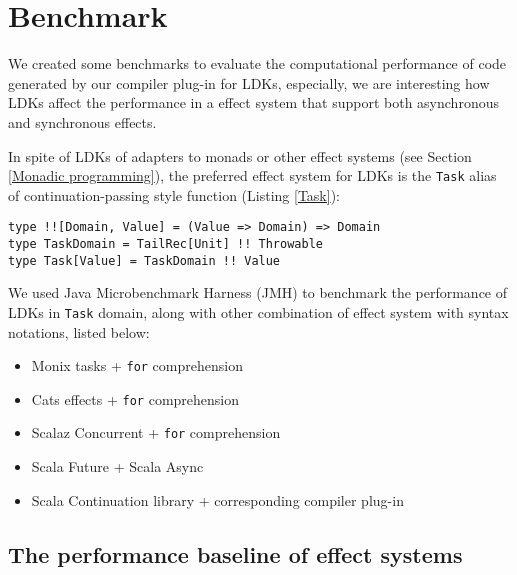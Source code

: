 \section{Benchmark}\label{Benchmark}

We created some benchmarks to evaluate the computational performance of code generated by our compiler plug-in for LDKs, especially, we are interesting how LDKs affect the performance in a effect system that support both asynchronous and synchronous effects.

In spite of LDKs of adapters to monads or other effect systems (see Section \ref{Monadic programming}), the preferred effect system for LDKs is the \lstinline{Task} alias of continuation-passing style function (Listing \ref{Task}):

\begin{lstlisting}[caption={The definition of \lstinline{Task}, the preferred effect system using with LDKs},label={Task}]
type !![Domain, Value] = (Value => Domain) => Domain
type TaskDomain = TailRec[Unit] !! Throwable
type Task[Value] = TaskDomain !! Value
\end{lstlisting}

We used Java Microbenchmark Harness (JMH) to benchmark the performance of LDKs in \lstinline{Task} domain, along with other combination of effect system with syntax notations, listed below:

\begin{itemize}
  \item Monix tasks \cite{nedelcu2017monix} + \lstinline{for} comprehension
  \item Cats effects \cite{typelevel2017cats} + \lstinline{for} comprehension
  \item Scalaz Concurrent \cite{kenji2017scalaz} + \lstinline{for} comprehension
  \item Scala Future \cite{haller2012sip} + Scala Async \cite{haller2013sip}
  \item Scala Continuation library + corresponding compiler plug-in \cite{rompf2009implementing}
\end{itemize}


\subsection{The performance baseline of effect systems}

